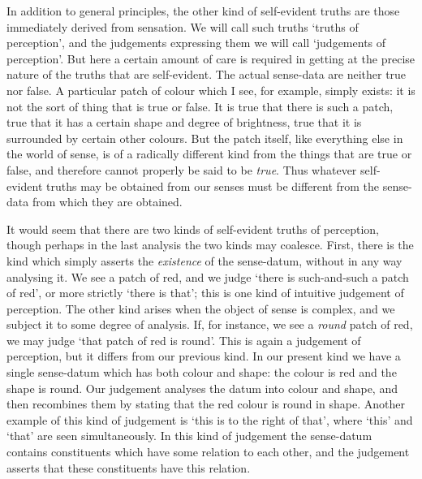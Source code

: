\documentclass[oneside,letterpaper,12pt]{book}
\begin{document}
In addition to general principles, the other kind of self-evident truths
are those immediately derived from sensation. We will call such truths
`truths of perception', and the
judgements expressing them we will call `judgements of
perception'. But here a certain amount of care is
required in getting at the precise nature of the truths that are
self-evident. The actual sense-data are neither true nor false. A
particular patch of colour which I see, for example, simply exists: it
is not the sort of thing that is true or false. It is true that there is
such a patch, true that it has a certain shape and degree of brightness,
true that it is surrounded by certain other colours. But the patch
itself, like everything else in the world of sense, is of a radically
different kind from the things that are true or false, and therefore
cannot properly be said to be \emph{true}. Thus whatever self-evident
truths may be obtained from our senses must be different from the
sense-data from which they are obtained.

It would seem that there are two kinds of self-evident truths of
perception, though perhaps in the last analysis the two kinds may
coalesce. First, there is the kind which simply asserts the
\emph{existence} of the sense-datum, without in any way analysing it. We
see a patch of red, and we judge `there is such-and-such
a patch of red', or more strictly `there
is that'; this is one kind of intuitive judgement of
perception. The other kind arises when the object of sense is complex,
and we subject it to some degree of analysis. If, for instance, we see a
\emph{round} patch of red, we may judge `that patch of
red is round'. This is again a judgement of perception,
but it differs from our previous kind. In our present kind we have a
single sense-datum which has both colour and shape: the colour is red
and the shape is round. Our judgement analyses the datum into colour and
shape, and then recombines them by stating that the red colour is round
in shape. Another example of this kind of judgement is
`this is to the right of that', where
`this' and
`that' are seen simultaneously. In this
kind of judgement the sense-datum contains constituents which have some
relation to each other, and the judgement asserts that these
constituents have this relation.
\end{document}
